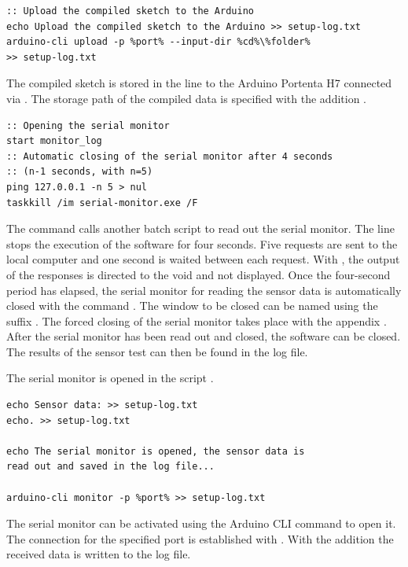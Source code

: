 \begin{lstlisting}
:: Upload the compiled sketch to the Arduino
echo Upload the compiled sketch to the Arduino >> setup-log.txt
arduino-cli upload -p %port% --input-dir %cd%\%folder% 
>> setup-log.txt
\end{lstlisting}

The compiled sketch is stored in the line    to the Arduino Portenta H7 connected via . The storage path of the compiled data is specified with the addition .

\begin{lstlisting}
:: Opening the serial monitor
start monitor_log
:: Automatic closing of the serial monitor after 4 seconds 
:: (n-1 seconds, with n=5)
ping 127.0.0.1 -n 5 > nul
taskkill /im serial-monitor.exe /F
\end{lstlisting}

The command  calls another batch script to read out the serial monitor. The line  stops the execution of the software for four seconds. Five requests are sent to the local computer and one second is waited between each request. With , the output of the responses is directed to the void and not displayed. Once the four-second period has elapsed, the serial monitor for reading the sensor data is automatically closed with the command . The window to be closed can be named  using the suffix . The forced closing of the serial monitor takes place with the appendix . After the serial monitor has been read out and closed, the software can be closed. The results of the sensor test can then be found in the log file.

The serial monitor is opened in the script .

\begin{lstlisting}
echo Sensor data: >> setup-log.txt
echo. >> setup-log.txt

echo The serial monitor is opened, the sensor data is 
read out and saved in the log file...

arduino-cli monitor -p %port% >> setup-log.txt
\end{lstlisting}	

The serial monitor can be activated using the Arduino CLI command   to open it. The connection for the specified port is established with . With the addition  the received data is written to the log file.
